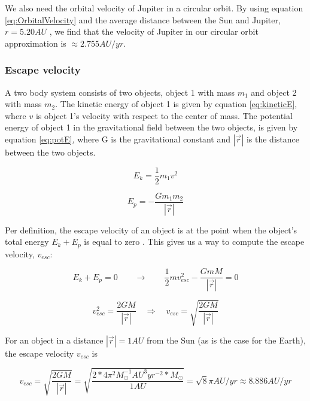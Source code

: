 \documentclass[norsk,a4paper,12pt]{article}
\begin{document}
We also need the orbital velocity of Jupiter in a circular orbit. By using equation \ref{eq:OrbitalVelocity} and the average distance between the Sun and Jupiter, $r = 5.20 AU$ \cite{Project_text}, we find that the velocity of Jupiter in our circular orbit approximation is $\approx 2.755 AU/yr$.

\subsubsection{Escape velocity}
A two body system consists of two objects, object 1 with mass $m_1$ and object 2 with mass $m_2$. The kinetic energy of object 1 is given by equation \ref{eq:kineticE}, where $v$ is object 1's velocity with respect to the center of mass. The potential energy of object 1 in the gravitational field between the two objects, is given by equation \ref{eq:potE}, where G is the gravitational constant and $|\vec{r}|$ is the distance between the two objects. 

\begin{equation}
    E_k = \frac{1}{2} m_1 v^2
    \label{eq:kineticE}
\end{equation}

\begin{equation}
    E_p = - \frac{G m_1 m_2}{|\vec{r}|}
    \label{eq:potE}
\end{equation}
\par 
\vspace{3mm}

Per definition, the escape velocity of an object is at the point when the object's total energy $E_k + E_p$ is equal to zero \cite{kepler}. This gives us a way to compute the escape velocity, $v_{esc}$:

\begin{equation*}
    E_k + E_p = 0 \qquad \rightarrow \qquad \frac{1}{2} m v_{esc}^2 - \frac{G m M}{|\vec{r}|} = 0
\end{equation*}

\begin{equation}
     v_{esc}^2 = \frac{2 G M}{|\vec{r}|} \quad \Rightarrow \quad v_{esc} = \sqrt{\frac{2 G M}{|\vec{r}|}}
     \label{esc_v}
\end{equation}

For an object in a distance $|\vec{r}| = 1AU$ from the Sun (as is the case for the Earth), the escape velocity $v_{esc}$ is 

\begin{equation*}
    v_{esc} = \sqrt{\frac{2 G M}{|\vec{r}|}} = \sqrt{\frac{2 * 4\pi^2 M_{\odot} ^{-1} AU^3 yr^{-2} * M_{\odot}}{1 AU}} = \sqrt{8}\pi AU/yr \approx 8.886 AU/yr
\end{equation*}
\end{document}

